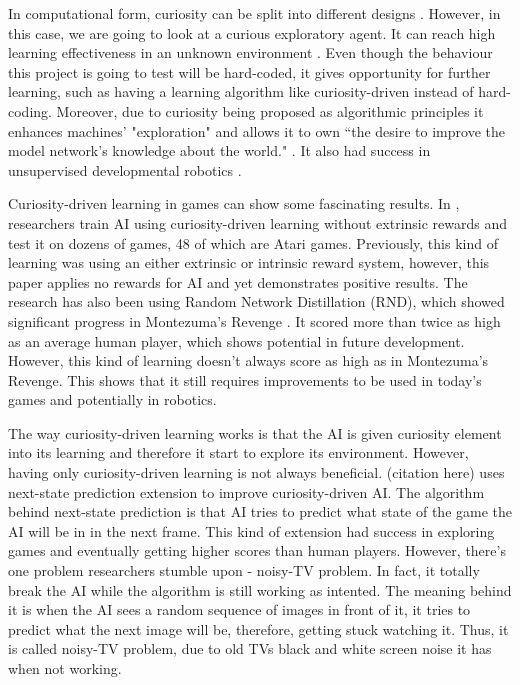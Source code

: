 \documentclass[journal]{IEEEtran}
\begin{document}
In computational form, curiosity can be split into different designs \cite{wu2013curiosity}. However, in this case, we are going to look at a curious exploratory agent. It can reach high learning effectiveness in an unknown environment \cite{wu2013curiosity}\cite{macedo2005role}. Even though the behaviour this project is going to test will be hard-coded, it gives opportunity for further learning, such as having a learning algorithm like curiosity-driven instead of hard-coding. Moreover, due to curiosity being proposed as algorithmic principles \cite{wu2013curiosity}\cite{pang2009curiosity}\cite{karaoguz2011curiosity} it enhances machines' "exploration" and allows it to own ``the desire to improve the model network's knowledge about the world." \cite{schmidhuber1991possibility}. It also had success in unsupervised developmental robotics \cite{schmidhuber2006developmental}\cite{oudeyer2004intelligent}.

Curiosity-driven learning in games can show some fascinating results. In \cite{burda2018large}, researchers train AI using curiosity-driven learning without extrinsic rewards and test it on dozens of games, 48 of which are Atari games. Previously, this kind of learning was using an either extrinsic or intrinsic reward system, however, this paper applies no rewards for AI and yet demonstrates positive results. The research has also been using Random Network Distillation (RND), which showed significant progress in Montezuma's Revenge \cite{openairl}\cite{montezumarevenge}. It scored more than twice as high as an average human player, which shows potential in future development. However, this kind of learning doesn't always score as high as in Montezuma's Revenge. This shows that it still requires improvements to be used in today's games and potentially in robotics.

The way curiosity-driven learning works is that the AI is given curiosity element into its learning and therefore it start to explore its environment. However, having only curiosity-driven learning is not always beneficial. (citation here) uses next-state prediction extension to improve curiosity-driven AI. The algorithm behind next-state prediction is that AI tries to predict what state of the game the AI will be in in the next frame. This kind of extension had success in exploring games and eventually getting higher scores than human players. However, there's one problem researchers stumble upon - noisy-TV problem. In fact, it totally break the AI while the algorithm is still working as intented. The meaning behind it is when the AI sees a random sequence of images in front of it, it tries to predict what the next image will be, therefore, getting stuck watching it. Thus, it is called noisy-TV problem, due to old TVs black and white screen noise it has when not working.
\end{document}
